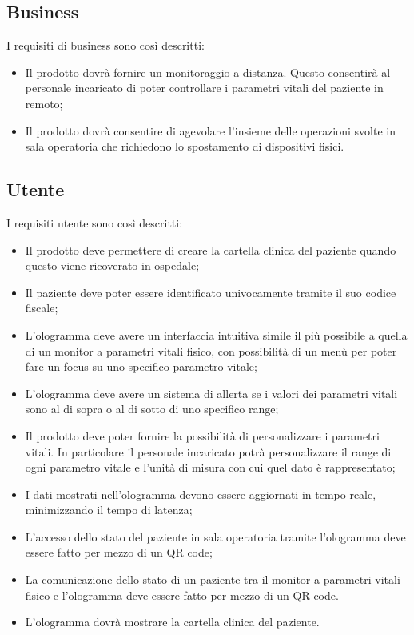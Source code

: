 \subsection{Business}
I requisiti di business sono così descritti:

\begin{itemize}
    \item Il prodotto dovrà fornire un monitoraggio a distanza. Questo consentirà al personale incaricato di poter controllare i parametri vitali del paziente in remoto;
    
    \item Il prodotto dovrà consentire di agevolare l'insieme delle operazioni svolte in sala operatoria che richiedono lo spostamento di dispositivi fisici.
\end{itemize}

\subsection{Utente}
I requisiti utente sono così descritti:

\begin{itemize}
    \item Il prodotto deve permettere di creare la cartella clinica del paziente quando questo viene ricoverato in ospedale;
    
    \item Il paziente deve poter essere identificato univocamente tramite il suo codice fiscale;

    \item L'ologramma deve avere un interfaccia intuitiva simile il più possibile a quella di un monitor a parametri vitali fisico, con possibilità di un menù per poter fare un focus su uno specifico parametro vitale;
    
    \item L'ologramma deve avere un sistema di allerta se i valori dei parametri vitali sono al di sopra o al di sotto di uno specifico range;
    
    \item Il prodotto deve poter fornire la possibilità di personalizzare i parametri vitali. In particolare il personale incaricato potrà personalizzare il range di ogni parametro vitale e l'unità di misura con cui quel dato è rappresentato;
    
    \item I dati mostrati nell'ologramma devono essere aggiornati in tempo reale, minimizzando il tempo di latenza;
    
    \item L'accesso dello stato del paziente in sala operatoria tramite l'ologramma deve essere fatto per mezzo di un QR code;

    \item La comunicazione dello stato di un paziente tra il monitor a parametri vitali fisico e l'ologramma deve essere fatto per mezzo di un QR code.
    
    \item L'ologramma dovrà mostrare la cartella clinica del paziente.
\end{itemize}

